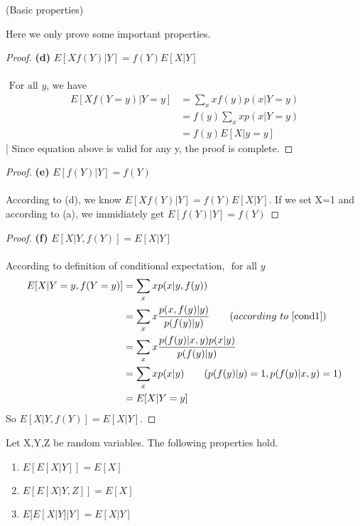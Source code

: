 \begin{enumerate}
\begin{lemma}{(Basic properties)}
  \end{lemma}
  Here we only prove some important properties.
  \begin{proof}{\textbf{(d)} $E[Xf(Y)|Y] = f(Y)E[X|Y]$}
    \\ \\ $\text{ For all } y$, we have
    \begin{align*}
      E[Xf(Y=y)|Y=y] &= \sum_{x}xf(y)p(x|Y=y) \\
      &= f(y)\sum_{x}xp(x|Y=y) \\
      &= f(y)E[X|y=y]
    \end{align*}
    | Since equation above is valid for any y, the proof is complete.
  \end{proof}
  \begin{proof}{\textbf{(e)} $E[f(Y)|Y] = f(Y)$}
    \\ \\According to (d), we know $E[Xf(Y)|Y] = f(Y)E[X|Y]$. If we set X=1 and according to (a), we immidiately get
    $E[f(Y)|Y] = f(Y)$
  \end{proof}
  \begin{proof}{\textbf{(f)} $E[X|Y,f(Y)] = E[X|Y]$}
    \\ \\According to definition of conditional expectation, $\text{ for all } y$
    \begin{align*}
      E[X|Y=y,f(Y=y)] &= \sum_{x}xp(x|y,f(y)) \\
      &=\sum_{x}x \frac{p(x,f(y)|y)}{p(f(y)|y)} \qquad (according\ to\ \ref{cond1}) \\
      &=\sum_{x}x \frac{p(f(y)|x,y)p(x|y)}{p(f(y)|y)} \\
      &=\sum_{x}xp(x|y) \qquad (p(f(y)|y)=1, p(f(y)|x,y)=1) \\
      &= E[X|Y=y]
    \end{align*}
    So $E[X|Y,f(Y)] = E[X|Y]$.
  \end{proof}

  \begin{lemma}{Let X,Y,Z be random variables. The following properties hold.}
    \begin{enumerate}

    \item
      $E[E[X|Y]]=E[X]$
    \item
      $E[E[X|Y,Z]]=E[X]$
    \item
      $E[E[X|Y]|Y]=E[X|Y]$

    \end{enumerate}


\end{lemma}
\end{enumerate}
